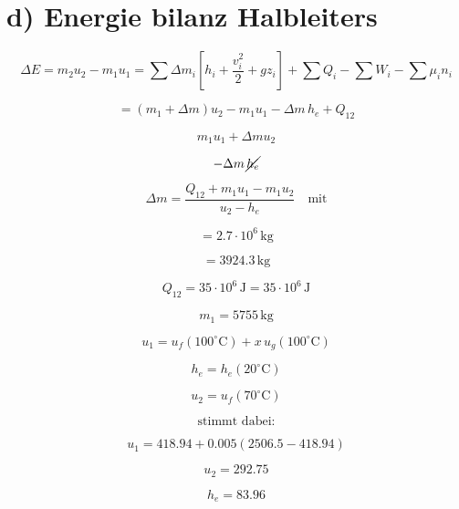 \section*{d) Energie bilanz Halbleiters}

\[
\Delta E = m_2 u_2 - m_1 u_1 = \sum \Delta m_i \left[ h_i + \frac{v_i^2}{2} + g z_i \right] + \sum Q_i - \sum W_i - \sum \mu_i n_i
\]

\[
= (m_1 + \Delta m) u_2 - m_1 u_1 - \Delta m \, h_e + Q_{12}
\]

\[
m_1 u_1 + \Delta m u_2
\]

\[
- \Delta m \, \cancel{h_e}
\]

\[
\Delta m = \frac{Q_{12} + m_1 u_1 - m_1 u_2}{u_2 - h_e} \quad \text{mit}
\]

\[
= 2.7 \cdot 10^6 \, \text{kg}
\]

\[
= 3924.3 \, \text{kg}
\]

\[
Q_{12} = 35 \cdot 10^6 \, \text{J} = 35 \cdot 10^6 \, \text{J}
\]

\[
m_1 = 5755 \, \text{kg}
\]

\[
u_1 = u_f (100^\circ \text{C}) + x \, u_g (100^\circ \text{C})
\]

\[
h_e = h_e (20^\circ \text{C})
\]

\[
u_2 = u_f (70^\circ \text{C})
\]

\[
\text{stimmt dabei:}
\]

\[
u_1 = 418.94 + 0.005 (2506.5 - 418.94)
\]

\[
u_2 = 292.75
\]

\[
h_e = 83.96
\]